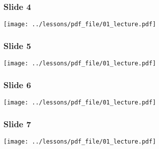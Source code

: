 \documentclass[../main/main.tex]{subfiles}
\begin{document}
\subsubsection*{Slide 4}

\begin{minipage}[]{0.5\linewidth}
\centering
\texttt{[image: ../lessons/pdf\_file/01\_lecture.pdf]}
\end{minipage}
\hspace{0.3cm}\vspace{0.3cm}
\begin{minipage}[c]{0.47\linewidth}

\end{minipage}

\subsubsection*{Slide 5}

\begin{minipage}[]{0.5\linewidth}
\centering
\texttt{[image: ../lessons/pdf\_file/01\_lecture.pdf]}
\end{minipage}
\hspace{0.3cm}\vspace{0.3cm}
\begin{minipage}[c]{0.47\linewidth}

\end{minipage}

\subsubsection*{Slide 6}

\begin{minipage}[]{0.5\linewidth}
\centering
\texttt{[image: ../lessons/pdf\_file/01\_lecture.pdf]}
\end{minipage}
\hspace{0.3cm}\vspace{0.3cm}
\begin{minipage}[c]{0.47\linewidth}

\end{minipage}

\newpage

\subsubsection*{Slide 7}

\begin{minipage}[]{0.5\linewidth}
\centering
\texttt{[image: ../lessons/pdf\_file/01\_lecture.pdf]}
\end{minipage}
\hspace{0.3cm}\vspace{0.3cm}
\begin{minipage}[c]{0.47\linewidth}

\end{minipage}
\end{document}
